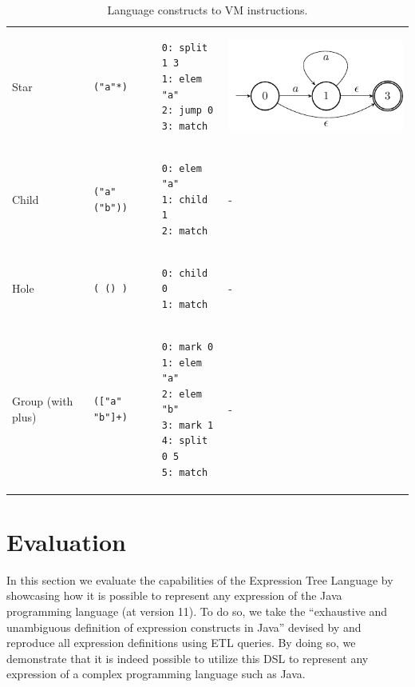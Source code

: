 \begin{chapterBody}
\begin{table}[ht]
\begin{tabular}{llll}
Star &
\begin{lstlisting}[language=etl]
("a"*)
\end{lstlisting} &
\begin{lstlisting}[language=etl-vm]
0: split 1 3
1: elem "a"
2: jump 0
3: match
\end{lstlisting} &
\includegraphics[width=0.3\linewidth]{res/4/etl_vm_star.pdf} \\

Child &
\begin{lstlisting}[language=etl]
("a" ("b"))
\end{lstlisting} &
\begin{lstlisting}[language=etl-vm]
0: elem "a"
1: child 1
2: match
\end{lstlisting} & - \\

Hole &
\begin{lstlisting}[language=etl]
( () )
\end{lstlisting} &
\begin{lstlisting}[language=etl-vm]
0: child 0
1: match
\end{lstlisting} & - \\

Group (with plus) &
\begin{lstlisting}[language=etl]
(["a" "b"]+)
\end{lstlisting} &
\begin{lstlisting}[language=etl-vm]
0: mark 0
1: elem "a"
2: elem "b"
3: mark 1
4: split 0 5
5: match
\end{lstlisting} & - \\
\end{tabular}
\caption{Language constructs to VM instructions.}
\label{tab:etl-lang-to-vm}
\end{table}

\section{Evaluation}\label{sec:etl-eval}

In this section we evaluate the capabilities of the Expression Tree Language
by showcasing how it is possible to represent any expression of the Java 
programming language (at version 11). To do so, we take the ``exhaustive and
unambiguous definition of expression constructs in Java'' devised by
\citet{chiodini_expressions_2022} and reproduce all expression definitions using
ETL queries. By doing so, we demonstrate that it is indeed possible to utilize
this DSL to represent any expression of a complex programming language such as
Java.


\end{chapterBody}
